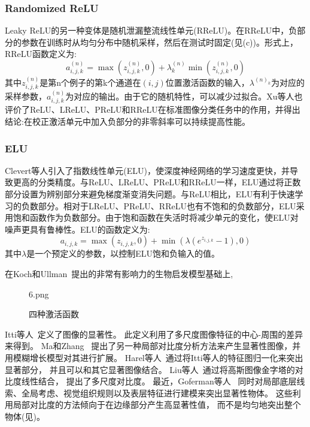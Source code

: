 \documentclass[final]{cvpr}
\begin{document}
\subsubsection{Randomized ReLU}
Leaky ReLU的另一种变体是随机泄漏整流线性单元(RReLU)。在RReLU中，负部分的参数在训练时从均匀分布中随机采样，然后在测试时固定(见(c))。形式上，RReLU函数定义为:
\begin{equation}
	a^{(n)}_{i,j,k}=\max(z^{(n)}_{i,j,k},0)+\lambda^{(n)}_k\min(z^{(n)}_{i,j,k},0)
\end{equation}
其中$z^{(n)}_{i,j,k}$是第n个例子的第k个通道在$(i, j)$位置激活函数的输入，$\lambda^{(n)_k}$为对应的采样参数，$a^{(n)}_{i,j,k}$为对应的输出。由于它的随机特性，可以减少过拟合。Xu等人也评价了ReLU、LReLU、PReLU和RReLU在标准图像分类任务中的作用，并得出结论:在校正激活单元中加入负部分的非零斜率可以持续提高性能。
\subsubsection{ELU}
Clevert等人引入了指数线性单元(ELU)，使深度神经网络的学习速度更快，并导致更高的分类精度。与ReLU、LReLU、PReLU和RReLU一样，ELU通过将正数部分设置为辨别部分来避免梯度渐变消失问题。与ReLU相比，ELU有利于快速学习的负数部分。相对于LReLU、PReLU、RReLU也有不饱和的负数部分，ELU采用饱和函数作为负数部分。由于饱和函数在失活时将减少单元的变化，使ELU对噪声更具有鲁棒性。ELU的函数定义为:
\begin{equation}
	a_{i,j,k}=\max(z_{i,j,k},0)+\min(\lambda(e^{z_{i,j,k}}-1),0)
\end{equation}
其中$\lambda$是一个预定义的参数，以控制ELU饱和负输入的值。



















在Koch和Ullman~\cite{85HN/KochVisualAttention}提出的非常有影响力的生物启发模型基础上,
\begin{figure}[t!]
	\begin{overpic}[width=\columnwidth]{6.png}
	\end{overpic}
	\caption{四种激活函数
	}\label{fig:relu}
\end{figure}
Itti等人~\cite{98pami/Itti}定义了图像的显著性。
此定义利用了多尺度图像特征的中心-周围的差异来得到。
Ma和Zhang~\cite{03ACMMM/Ma_Contrast-based}
提出了另一种局部对比度分析方法来产生显著性图像，并用模糊增长模型对其进行扩展。
Harel等人~\cite{conf/nips/HarelKP06}通过将Itti等人的特征图归一化来突出显著部分，
并且可以和其它显著图像结合。
Liu等人~\cite{10pami/Liu_Learning}通过将高斯图像金字塔的对比度线性结合，
提出了多尺度对比度。
最近，Goferman等人~\cite{10cvpr/goferman_context}
同时对局部底层线索、全局考虑、视觉组织规则以及表层特征进行建模来突出显著性物体。
这些利用局部对比度的方法倾向于在边缘部分产生高显著性值，
而不是均匀地突出整个物体(见)。
\end{document}
